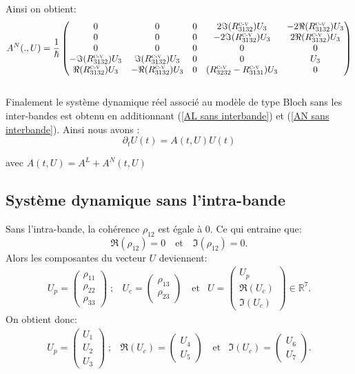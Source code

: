 \documentclass[12pt,a4paper,openany,oneside]{book}
\begin{document}
{{{{{{Ainsi on obtient:
\begin{equation}\label{AN sans interbande}
A^{N}(.,U)=\dfrac{1}{\hbar}
\begin{pmatrix}
0 & 0 & 0 & 2\Im(R^{\textsc{c-v}}_{3132})U_{3} & -2\Re(R^{\textsc{c-v}}_{3132})U_{3}\\
0 & 0 & 0 & -2\Im(R^{\textsc{c-v}}_{3132})U_{3} & 2\Re(R^{\textsc{c-v}}_{3132})U_{3}\\
0 & 0 & 0 &                   0                     &                     0              \\
-\Im(R^{\textsc{c-v}}_{3132})U_{3} & \Im(R^{\textsc{c-v}}_{3132})U_{3} & 0 & 0 & U_{3}\\
\Re(R^{\textsc{c-v}}_{3132})U_{3} & -\Re(R^{\textsc{c-v}}_{3132})U_{3} & 0 & (R^{\textsc{c-v}}_{3232}-R^{\textsc{c-v}}_{3131})U_{3} & 0
\end{pmatrix}
\end{equation}\\
  
Finalement le système dynamique réel associé au modèle de type Bloch sans les inter-bandes est obtenu en additionnant (\ref{AL sans interbande}) et (\ref{AN sans interbande}).
Ainsi nous avons :
$$
\partial_{t}U(t) = A(t,U)U(t) 
$$

avec $ A(t,U)= A^{L}+ A^{N}(t,U)$


\subsection{Système dynamique sans l'intra-bande}

Sans l'intra-bande, la cohérence $\rho_{12}$ est égale à 0. Ce qui entraine que:
$$\Re(\rho_{12})=0 \quad \textrm{et}\quad \Im(\rho_{12})=0 .$$
 Alors les composantes du vecteur $U$ deviennent:  
\begin{eqnarray*}
 U_{p} = \begin{pmatrix}\rho_{11}\\ \rho_{22}\\ \rho_{33}\end{pmatrix}\; ; &
U_{c} = \begin{pmatrix}\rho_{13} \\ \rho_{23}\end{pmatrix} \quad \textrm{et} &
U = \begin{pmatrix}U_{p}\\ \Re(U_{c})\\ \Im(U_{c})\end{pmatrix}\in \mathbb{R}^{7}.
\end{eqnarray*}
On obtient donc:
\begin{eqnarray*}
 U_{p} = \begin{pmatrix}U_{1}\\ U_{2}\\ U_{3}\end{pmatrix}\; ; &
\Re(U_{c})= \begin{pmatrix}U_{4} \\ U_{5}\end{pmatrix} \quad \textrm{et} &
\Im(U_{c})= \begin{pmatrix}U_{6}\\ U_{7}\end{pmatrix}.
\end{eqnarray*}

}}}}}}
\end{document}
